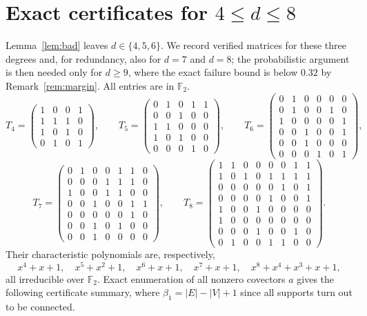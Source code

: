 \documentclass[11pt,reqno]{amsart}
\theoremstyle{plain}
\theoremstyle{definition}
\newcommand{\FF}{\mathbb{F}}
\begin{document}
\section{Exact certificates for \texorpdfstring{$4\le d\le 8$}{4<=d<=8}}\label{sec:certificates}

Lemma~\ref{lem:bad} leaves $d\in\{4,5,6\}$. We record verified matrices for these three degrees and, for redundancy, also for $d=7$ and $d=8$; the probabilistic argument is then needed only for $d\ge 9$, where the exact failure bound is below $0.32$ by Remark~\ref{rem:margin}. All entries are in $\FF_{2}$.
\[
T_{4}=\begin{pmatrix}
1&0&0&1\\ 1&1&1&0\\ 1&0&1&0\\ 0&1&0&1
\end{pmatrix},\qquad
T_{5}=\begin{pmatrix}
0&1&0&1&1\\ 0&0&1&0&0\\ 1&1&0&0&0\\ 1&0&1&0&0\\ 0&0&0&1&0
\end{pmatrix},\qquad
T_{6}=\begin{pmatrix}
0&1&0&0&0&0\\ 0&1&0&0&1&0\\ 1&0&0&0&0&1\\ 0&0&1&0&0&1\\ 0&0&1&0&0&0\\ 0&0&0&1&0&1
\end{pmatrix},
\]
\[
T_{7}=\begin{pmatrix}
0&1&0&0&1&1&0\\ 0&0&0&1&1&1&0\\ 1&0&0&1&1&0&0\\ 0&0&1&0&0&1&1\\ 0&0&0&0&0&1&0\\ 0&0&1&0&1&0&0\\ 0&0&1&0&0&0&0
\end{pmatrix},\qquad
T_{8}=\begin{pmatrix}
1&1&0&0&0&0&1&1\\ 1&0&1&0&1&1&1&1\\ 0&0&0&0&0&1&0&1\\ 0&0&0&0&1&0&0&1\\ 1&0&0&1&0&0&0&0\\ 1&0&0&0&0&0&0&0\\ 0&0&0&1&0&0&1&0\\ 0&1&0&0&1&1&0&0
\end{pmatrix}.
\]
Their characteristic polynomials are, respectively,
\[
x^{4}+x+1,\quad x^{5}+x^{2}+1,\quad x^{6}+x+1,\quad x^{7}+x+1,\quad x^{8}+x^{4}+x^{3}+x+1,
\]
all irreducible over $\FF_{2}$. Exact enumeration of all nonzero covectors $a$ gives the following certificate summary, where $\beta_{1}=|E|-|V|+1$ since all supports turn out to be connected.
\end{document}
